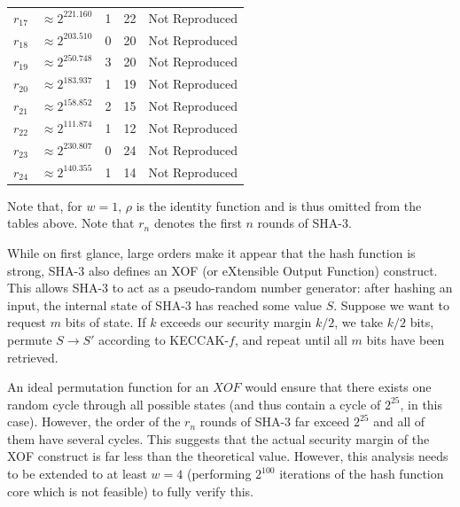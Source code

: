 \documentclass[10pt,twocolumn,twoside]{pnas-new}
\begin{document}
\begin{tabular}{c c c c c}
    $r_{17}$ & $\approx 2^{221.160}$ & 1 & 22 & Not Reproduced \\
    $r_{18}$ & $\approx 2^{203.510}$ & 0 & 20 & Not Reproduced \\
    $r_{19}$ & $\approx 2^{250.748}$ & 3 & 20 & Not Reproduced \\
    $r_{20}$ & $\approx 2^{183.937}$ & 1 & 19 & Not Reproduced \\
    $r_{21}$ & $\approx 2^{158.852}$ & 2 & 15 & Not Reproduced \\
    $r_{22}$ & $\approx 2^{111.874}$ & 1 & 12 & Not Reproduced \\
    $r_{23}$ & $\approx 2^{230.807}$ & 0 & 24 & Not Reproduced \\
    $r_{24}$ & $\approx 2^{140.355}$ & 1 & 14 & Not Reproduced
\end{tabular}

Note that, for $w=1$, $\rho$ is the identity function and is thus omitted from
the tables above. Note that $r_{n}$ denotes the first $n$ rounds of SHA-3.

While on first glance, large orders make it appear that the hash function is
strong, SHA-3 also defines an XOF (or eXtensible Output Function) construct.
This allows SHA-3 to act as a pseudo-random number generator: after hashing
an input, the internal state of SHA-3 has reached some value $S$. Suppose we
want to request $m$ bits of state. If $k$ exceeds our security margin $k/2$,
we take $k/2$ bits, permute $S \rightarrow S'$ according to KECCAK-$f$,
and repeat until all $m$ bits have been retrieved.

An ideal permutation function for an $XOF$ would ensure that there exists one
random cycle through all possible states (and thus contain a cycle of $2^{25}$,
in this case). However, the order of the $r_{n}$ rounds of SHA-3 far exceed
$2^{25}$ and all of them have several cycles. This suggests that the actual
security margin of the XOF construct is far less than the theoretical value.
However, this analysis needs to be extended to at least $w=4$ (performing
$2^{100}$ iterations of the hash function core which is not feasible) to
fully verify this.



\end{document}
